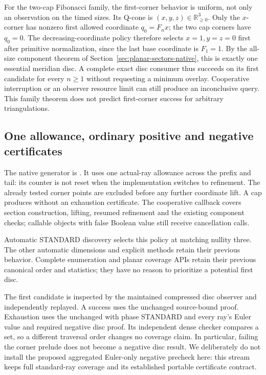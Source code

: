 For the two-cap Fibonacci family, the first-corner behavior is uniform,
not only an observation on the timed sizes. Its Q-cone is
$(x,y,z)\in\mathbb R_{\ge0}^3$. Only the $x$-corner has nonzero first
allowed coordinate $q_0=F_nx$; the two cap corners have $q_0=0$.
The decreasing-coordinate policy therefore selects $x=1,y=z=0$ first
after primitive normalization, since the last base coordinate is $F_1=1$.
By the all-size component theorem of Section~\ref{sec:planar-sectors-native},
this is exactly one essential meridian disc. A complete exact disc
consumer thus succeeds on its first candidate for every $n\ge1$ without
requesting a minimum overlay. Cooperative interruption or an observer
resource limit can still produce an inconclusive query. This family theorem
does not predict first-corner success for arbitrary triangulations.

\subsection{One allowance, ordinary positive and negative certificates}

The native generator is . It uses
one actual-ray allowance across the prefix and tail: its counter is not
reset when the implementation switches to refinement. The already tested
corner points are excluded before any further coordinate lift. A cap
produces  without an exhaustion certificate. The
cooperative callback covers section construction, lifting, resumed
refinement and the existing component checks; callable objects with false
Boolean value still receive cancellation calls.

Automatic STANDARD discovery selects this policy at matching nullity
three. The other automatic dimensions and explicit methods retain their
previous behavior. Complete enumeration and planar coverage APIs retain
their previous canonical order and statistics; they have no reason to
prioritize a potential first disc.

The first candidate is inspected by the maintained compressed disc
observer and independently replayed. A success uses the unchanged
 source-bound proof. Exhaustion uses the
unchanged  with phase STANDARD and every
ray's Euler value and required negative disc proof. Its independent dense
checker compares a set, so a different traversal order changes no coverage
claim. In particular, failing the corner prelude does not become a negative
disc result. We deliberately do not install the proposed aggregated
Euler-only negative precheck here: this stream keeps full standard-ray
coverage and its established portable certificate contract.

